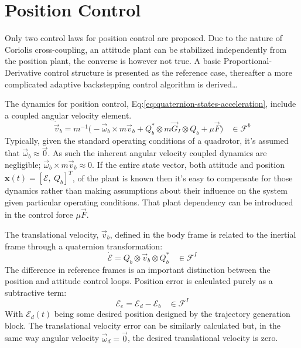 {\section{Position Control}
\label{sec:control.position}
Only two control laws for position control are proposed. Due to the nature of Coriolis cross-coupling, an attitude plant can be stabilized independently from the position plant, the converse is however not true. A basic Proportional-Derivative control structure is presented as the reference case, thereafter a more complicated adaptive backstepping control algorithm is derived\ldots
\par
The dynamics for position control, Eq:\ref{eq:quaternion-states-acceleration}, include a coupled angular velocity element.
\begin{equation}\label{eq:position-deriv}
\dot{\vec{v}}_b=m^{-1}\big(-\vec{\omega}_b\times m\vec{v}_b+Q_b^*\otimes m\vec{G}_I\otimes Q_b+\mu\vec{F}\big)~~~~\in\mathcal{F}^b
\end{equation}
Typically, given the standard operating conditions of a quadrotor, it's assumed that $\vec{\omega}_b\approx\vec{0}$. As such the inherent angular velocity coupled dynamics are negligible; $\vec{\omega}_b\times m\vec{v}_b\approx 0$. If the entire state vector, both attitude and position $\mathbf{x}(t)=[\mathcal{E},~Q_b]^T$, of the plant is known then it's easy to compensate for those dynamics rather than making assumptions about their influence on the system given particular operating conditions. That plant dependency can be introduced in the control force $\mu\vec{F}$. 
\par
The translational velocity, $\vec{v}_b$, defined in the body frame is related to the inertial frame through a quaternion transformation:
\begin{equation}
\dot{\mathcal{E}}=Q_b\otimes\vec{v}_b\otimes Q_b^*~~~~\in\mathcal{F}^I
\end{equation}
The difference in reference frames is an important distinction between the position and attitude control loops. Position error is calculated purely as a subtractive term:
\begin{equation}
\mathcal{E}_e=\mathcal{E}_d-\mathcal{E}_b~~~~\in\mathcal{F}^I
\end{equation}
With $\mathcal{E}_d(t)$ being some desired position designed by the trajectory generation block. The translational velocity error can be similarly calculated but, in the same way angular velocity $\vec{\omega}_d=\vec{0}$, the desired translational velocity is zero.
}
